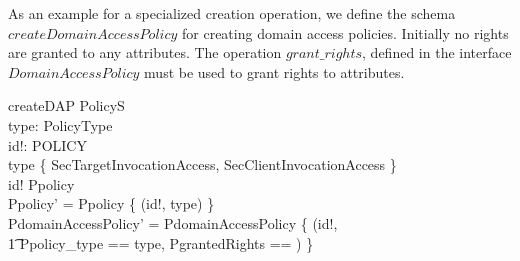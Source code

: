 
As an example for a specialized creation operation, we define the schema
$createDomainAccessPolicy$ for creating domain access policies.  Initially no
rights are granted to any attributes.  The operation $grant\_rights$, defined in
the interface $DomainAccessPolicy$ must be used to grant rights to attributes.

\begin{schema}{createDAP}
  \Delta PolicyS \\
  type: PolicyType \\
  id!: POLICY \\
  \where
  type \in \{ SecTargetInvocationAccess, SecClientInvocationAccess \} \\

  id! \notin \dom Ppolicy \\

  Ppolicy' = Ppolicy \cup \{ (id!, type) \} \\
  PdomainAccessPolicy' = PdomainAccessPolicy \cup \{ (id!, \\
  \t1 \lbind Ppolicy\_type == type, PgrantedRights == \emptyset \rbind ) \} \\
\end{schema}

